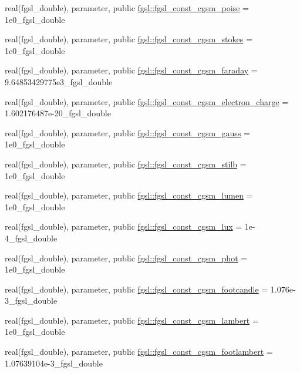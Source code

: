 \begin{DoxyCompactItemize}
\item 
real(fgsl\+\_\+double), parameter, public \hyperlink{namespacefgsl_ac2108186e2fec1e447f96ad1ab30ae23}{fgsl\+::fgsl\+\_\+const\+\_\+cgsm\+\_\+poise} = 1e0\+\_\+fgsl\+\_\+double
\item 
real(fgsl\+\_\+double), parameter, public \hyperlink{namespacefgsl_a3d38806d98751c252e4450fb1df5b246}{fgsl\+::fgsl\+\_\+const\+\_\+cgsm\+\_\+stokes} = 1e0\+\_\+fgsl\+\_\+double
\item 
real(fgsl\+\_\+double), parameter, public \hyperlink{namespacefgsl_a147d94db9ca3b698ccb636b75b27484e}{fgsl\+::fgsl\+\_\+const\+\_\+cgsm\+\_\+faraday} = 9.\+64853429775e3\+\_\+fgsl\+\_\+double
\item 
real(fgsl\+\_\+double), parameter, public \hyperlink{namespacefgsl_a5dafed1eec73194b34fc66d1e9337dc3}{fgsl\+::fgsl\+\_\+const\+\_\+cgsm\+\_\+electron\+\_\+charge} = 1.\+602176487e-\/20\+\_\+fgsl\+\_\+double
\item 
real(fgsl\+\_\+double), parameter, public \hyperlink{namespacefgsl_af917fb04d607724208d74a65a71644fe}{fgsl\+::fgsl\+\_\+const\+\_\+cgsm\+\_\+gauss} = 1e0\+\_\+fgsl\+\_\+double
\item 
real(fgsl\+\_\+double), parameter, public \hyperlink{namespacefgsl_a8f6eb902874b66bc00a4959e7444cb1a}{fgsl\+::fgsl\+\_\+const\+\_\+cgsm\+\_\+stilb} = 1e0\+\_\+fgsl\+\_\+double
\item 
real(fgsl\+\_\+double), parameter, public \hyperlink{namespacefgsl_a754f063aac1363ab86693605311aeaf8}{fgsl\+::fgsl\+\_\+const\+\_\+cgsm\+\_\+lumen} = 1e0\+\_\+fgsl\+\_\+double
\item 
real(fgsl\+\_\+double), parameter, public \hyperlink{namespacefgsl_aba54a122b0e64f01ac54513a4a0f6a9f}{fgsl\+::fgsl\+\_\+const\+\_\+cgsm\+\_\+lux} = 1e-\/4\+\_\+fgsl\+\_\+double
\item 
real(fgsl\+\_\+double), parameter, public \hyperlink{namespacefgsl_a97e19ca0cdcef10fb78328e155bc5671}{fgsl\+::fgsl\+\_\+const\+\_\+cgsm\+\_\+phot} = 1e0\+\_\+fgsl\+\_\+double
\item 
real(fgsl\+\_\+double), parameter, public \hyperlink{namespacefgsl_ab94d2a4bddeb2056b97285714a740131}{fgsl\+::fgsl\+\_\+const\+\_\+cgsm\+\_\+footcandle} = 1.\+076e-\/3\+\_\+fgsl\+\_\+double
\item 
real(fgsl\+\_\+double), parameter, public \hyperlink{namespacefgsl_a9dcbf51e3d416e2da01a503e5ba573bc}{fgsl\+::fgsl\+\_\+const\+\_\+cgsm\+\_\+lambert} = 1e0\+\_\+fgsl\+\_\+double
\item 
real(fgsl\+\_\+double), parameter, public \hyperlink{namespacefgsl_a392158d18a3d487acc9ed9d88636066c}{fgsl\+::fgsl\+\_\+const\+\_\+cgsm\+\_\+footlambert} = 1.\+07639104e-\/3\+\_\+fgsl\+\_\+double

\end{DoxyCompactItemize}
